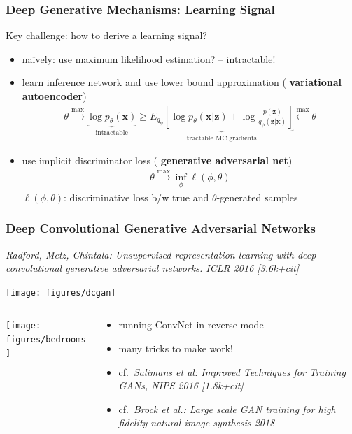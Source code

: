 \documentclass[compress]{beamer}
\newcommand{\x}{{\mathbf x}}
\newcommand{\z}{{\mathbf z}}
\newcommand{\E}{{E}}
\newcommand{\textbblue}[1]{{\bf\color{Blue} #1}}
\newcommand{\textbred}[1]{{\bf\color{Red} #1}}
\newcommand{\is}[1]{\setlength{\itemsep}{#1}}
\begin{document}
\begin{frame}
\frametitle{
Deep Generative Mechanisms: Learning Signal
}
Key challenge: how to derive a learning signal?\\[2mm]
\begin{itemize}\is{2mm}
\item na\"ively: use maximum likelihood estimation? -- intractable!
\item learn inference network and use lower bound approximation (\textbblue{variational autoencoder})
\begin{align*}
\theta \stackrel{\text{max}}\longrightarrow \underbrace{\log p_\theta(\x)}_{\text{intractable}} \ge \underbrace{\E_{q_\phi}\left[\log p_\theta(\x|\z) + \log \frac{p(\z)}{q_\phi(\z|\x)} \right]}_{\text{tractable MC gradients}}
\stackrel{\text{max}}\longleftarrow \theta 
\end{align*}
\item use implicit discriminator loss (\textbred{generative adversarial net})
\begin{align*}
\theta \stackrel{\text{max}}\longrightarrow  \inf_\phi \ell(\phi,\theta)
\end{align*}
$\ell(\phi,\theta)$: discriminative loss b/w true and $\theta$-generated samples
\end{itemize}
\end{frame}

\begin{frame} \frametitle{Deep Convolutional Generative Adversarial Networks}
{\small \textit{Radford, Metz, Chintala: Unsupervised representation learning with deep convolutional generative adversarial networks. ICLR 2016 [3.6k+cit]}}
\begin{center}
\texttt{[image: figures/dcgan]}
\end{center}
\begin{columns}
\begin{column}{0.25\textwidth}
\texttt{[image: figures/bedrooms]}
\end{column}
\begin{column}{0.68\textwidth}
\begin{itemize}\is{1mm}
\item running ConvNet in reverse mode
\item many tricks to make work!
\item cf.~{\small \textit{Salimans et al: Improved Techniques for Training GANs, NIPS 2016 [1.8k+cit]}}
\item cf.~{\small \textit{Brock et al.: Large scale GAN training for high fidelity natural image synthesis 2018}}
\end{itemize}
\end{column}
\end{columns}
\end{frame}
\end{document}
